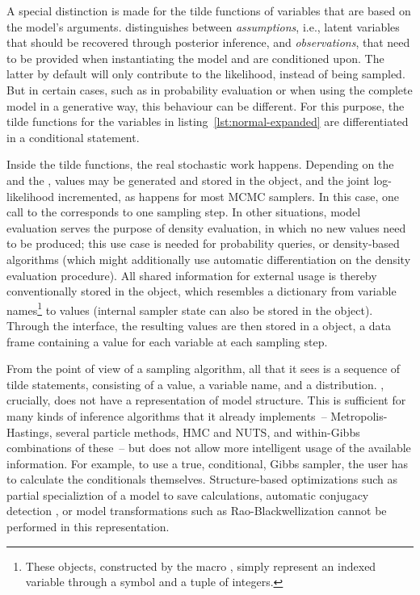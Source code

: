 A special distinction is made for the tilde functions of variables that are based on the model's
arguments. \dppljl{} distinguishes between \emph{assumptions}, i.e., latent variables that should be
recovered through posterior inference, and \emph{observations}, that need to be provided when
instantiating the model and are conditioned upon.  The latter by default will only contribute to the
likelihood, instead of being sampled.  But in certain cases, such as in probability evaluation or
when using the complete model in a generative way, this behaviour can be different.  For this
purpose, the tilde functions for the variables  in listing~\ref{lst:normal-expanded} are
differentiated in a conditional statement.

Inside the tilde functions, the real stochastic work happens.  Depending on the  and
the , values may be generated and stored in the  object, and the joint
log-likelihood incremented, as happens for most MCMC samplers.  In this case, one call to the
 corresponds to one sampling step.  In other situations, model evaluation serves
the purpose of density evaluation, in which no new values need to be produced; this use case is
needed for probability queries, or density-based algorithms (which might additionally use automatic
differentiation on the density evaluation procedure).  All shared information for external usage is
thereby conventionally stored in the  object, which resembles a dictionary from
variable names\footnote{These  objects, constructed by the macro ,
  simply represent an indexed variable through a symbol and a tuple of integers.}  to values
(internal sampler state can also be stored in the  object).  Through the
 interface, the resulting values are then stored in a  object, a data
frame containing a value for each variable at each sampling step.

From the point of view of a sampling algorithm, all that it sees is a sequence of tilde statements,
consisting of a value, a variable name, and a distribution.  \turingjl{}, crucially, does not have a
representation of model structure.  This is sufficient for many kinds of inference algorithms that
it already implements~-- Metropolis-Hastings, several particle methods, HMC and NUTS, and
within-Gibbs combinations of these~-- but does not allow more intelligent usage of the available
information.  For example, to use a true, conditional, Gibbs sampler, the user has to calculate the
conditionals themselves.  Structure-based optimizations such as partial specializtion of a model to
save calculations, automatic conjugacy detection \parencite{hoffman2018autoconj}, or model
transformations such as Rao-Blackwellization \parencite{murray2017delayed} cannot be performed in
this representation.


